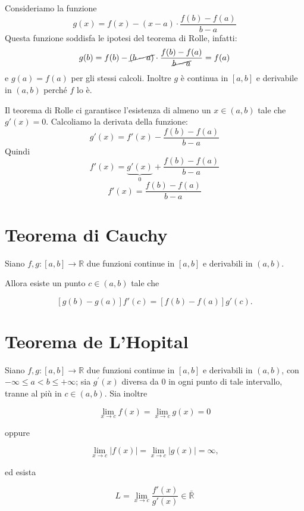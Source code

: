 Consideriamo la funzione
\begin{equation*}
g(x) = f(x) - (x-a) \cdot \frac{f(b)-f(a)}{b-a}
\end{equation*}
Questa funzione soddisfa le ipotesi del teorema di Rolle, infatti:
\begin{equation*}
g(b) = f(b) - \cancel{(b-a)} \cdot \frac{f(b)-f(a)}{\cancel{b-a}} = f(a)
\end{equation*} 
e $g(a) = f(a)$ per gli stessi calcoli. Inoltre $g$ è continua in $[a,b]$ e derivabile in $(a,b)$ perché $f$ lo è.

Il teorema di Rolle ci garantisce l'esistenza di almeno un $x \in (a,b)$ tale che $g'(x)=0$. Calcoliamo la derivata della funzione:
\begin{equation*}
g'(x) = f'(x) - \frac{f(b)-f(a)}{b-a}
\end{equation*}
Quindi
\begin{equation*}
f'(x) = \underbrace{g'(x)}_{0} + \frac{f(b)-f(a)}{b-a}
\end{equation*}
\begin{equation*}
f'(x) = \frac{f(b)-f(a)}{b-a}
\end{equation*}

\section{Teorema di Cauchy}
Siano $f, g : [a,b] \to \mathbb{R}$ due funzioni continue in $[a,b]$ e derivabili in $(a,b)$. 

Allora esiste un punto $c\in (a,b)$ tale che

$$[g(b)-g(a)]f'(c) = [f(b) - f(a)]g'(c).$$

\section{Teorema de L'Hopital}

Siano $f, g : [a,b] \rightarrow \mathbb{R}$ due funzioni continue in $[a,b]$ e derivabili in $(a,b)$, con $-\infty \leq a < b \leq +\infty$; sia $g^{\prime}(x)$ diversa da 0 in ogni punto di tale intervallo, tranne al più in $c \in (a,b)$. Sia inoltre

$$\lim_{x\to c}{f(x)} = \lim_{x\to c}g(x) = 0$$

oppure 

$$\lim_{x\to c}{|f(x)|} = \lim_{x\to c}{|g(x)|} = \infty,$$

ed esista 

$$ L = \lim_{x \to c}{\frac{f'(x)}{g'(x)}} \in \mathbb{\bar{R}} $$

